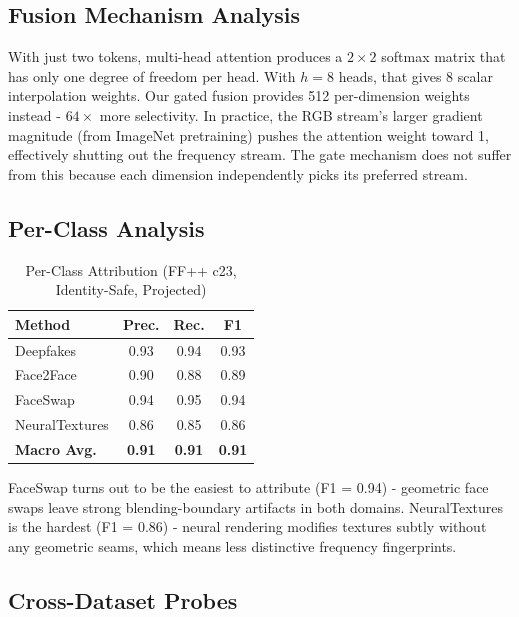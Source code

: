 \subsection{Fusion Mechanism Analysis}
\label{sec:fusion_ablation}

With just two tokens, multi-head attention produces a $2\!\times\!2$ softmax matrix that has only one degree of freedom per head. With $h = 8$ heads, that gives 8 scalar interpolation weights. Our gated fusion provides 512 per-dimension weights instead - $64\!\times$ more selectivity. In practice, the RGB stream's larger gradient magnitude (from ImageNet pretraining) pushes the attention weight toward 1, effectively shutting out the frequency stream. The gate mechanism does not suffer from this because each dimension independently picks its preferred stream.

\subsection{Per-Class Analysis}

\begin{table}[t]
\centering
\caption{Per-Class Attribution (FF++ c23, Identity-Safe, Projected)}
\label{tab:perclass}
\begin{tabular}{@{}lccc@{}}
\toprule
\textbf{Method} & \textbf{Prec.} & \textbf{Rec.} & \textbf{F1} \\
\midrule
Deepfakes & 0.93 & 0.94 & 0.93 \\
Face2Face & 0.90 & 0.88 & 0.89 \\
FaceSwap & 0.94 & 0.95 & 0.94 \\
NeuralTextures & 0.86 & 0.85 & 0.86 \\
\midrule
\textbf{Macro Avg.} & \textbf{0.91} & \textbf{0.91} & \textbf{0.91} \\
\bottomrule
\end{tabular}
\end{table}

FaceSwap turns out to be the easiest to attribute (F1 = 0.94) - geometric face swaps leave strong blending-boundary artifacts in both domains. NeuralTextures is the hardest (F1 = 0.86) - neural rendering modifies textures subtly without any geometric seams, which means less distinctive frequency fingerprints.

\subsection{Cross-Dataset Probes}

